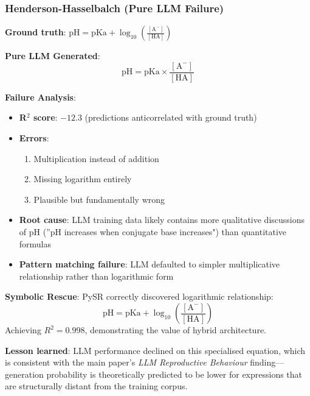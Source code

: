 \documentclass[twoside,11pt]{article}
\begin{document}
\subsubsection{Henderson-Hasselbalch (Pure LLM Failure)}

\begin{example}
\textbf{Ground truth}: $\text{pH} = \text{pKa} + \log_{10}\left(\frac{[\text{A}^-]}{[\text{HA}]}\right)$

\textbf{Pure LLM Generated}:
\begin{equation}
\text{pH} = \text{pKa} \times \frac{[\text{A}^-]}{[\text{HA}]}
\end{equation}

\textbf{Failure Analysis}:
\begin{itemize}
\item \textbf{R$^{2}$ score}: $-12.3$ (predictions anticorrelated with ground truth)
\item \textbf{Errors}:
  \begin{enumerate}
  \item Multiplication instead of addition
  \item Missing logarithm entirely
  \item Plausible but fundamentally wrong
  \end{enumerate}
\item \textbf{Root cause}: LLM training data likely contains more qualitative discussions of pH (''pH increases when conjugate base increases") than quantitative formulas
\item \textbf{Pattern matching failure}: LLM defaulted to simpler multiplicative relationship rather than logarithmic form
\end{itemize}

\textbf{Symbolic Rescue}:
PySR correctly discovered logarithmic relationship:
\begin{equation}
\text{pH} = \text{pKa} + \log_{10}\left(\frac{[\text{A}^-]}{[\text{HA}]}\right)
\end{equation}
Achieving $R^2 = 0.998$, demonstrating the value of hybrid architecture.

\textbf{Lesson learned}: LLM performance declined on this specialised equation, which is consistent with the main paper's \emph{LLM Reproductive Behaviour} finding---generation probability is theoretically predicted to be lower for expressions that are structurally distant from the training corpus\citep{kambhampati2024llms}.
\end{example}
\end{document}
